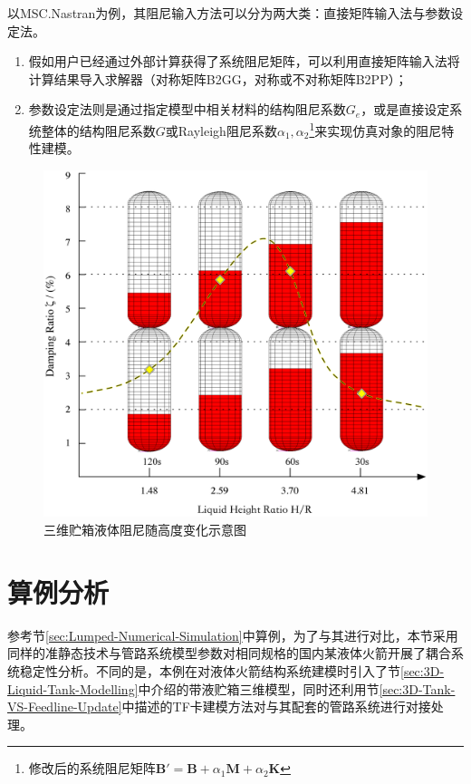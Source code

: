 以MSC.Nastran为例，其阻尼输入方法可以分为两大类：直接矩阵输入法与参数设定法。
\begin{enumerate}[leftmargin=\parindent, align=parleft, labelindent=0pt, labelwidth=*]
\item 假如用户已经通过外部计算获得了系统阻尼矩阵，可以利用直接矩阵输入法将计算结果导入求解器（对称矩阵B2GG，对称或不对称矩阵B2PP）；
\item 参数设定法则是通过指定模型中相关材料的结构阻尼系数$G_e$，或是直接设定系统整体的结构阻尼系数$G$或Rayleigh阻尼系数$\alpha_1,\alpha_2$\footnote{修改后的系统阻尼矩阵$\boldsymbol{B}'= \boldsymbol{B}+\alpha_1\boldsymbol{M}+\alpha_2\boldsymbol{K}$}来实现仿真对象的阻尼特性建模。
\end{enumerate}

\begin{figure}[!tb]
  \centering
  \includegraphics[width=\linewidth]{Time-Varing-Tank-Height}
  \caption{三维贮箱液体阻尼随高度变化示意图}\label{Time-Varing-Tank-Height}
\end{figure}

\section{算例分析}
参考节\ref{sec:Lumped-Numerical-Simulation}中算例，为了与其进行对比，本节采用同样的准静态技术与管路系统模型参数对相同规格的国内某液体火箭开展了耦合系统稳定性分析。不同的是，本例在对液体火箭结构系统建模时引入了节\ref{sec:3D-Liquid-Tank-Modelling}中介绍的带液贮箱三维模型，同时还利用节\ref{sec:3D-Tank-VS-Feedline-Update}中描述的TF卡建模方法对与其配套的管路系统进行对接处理。

